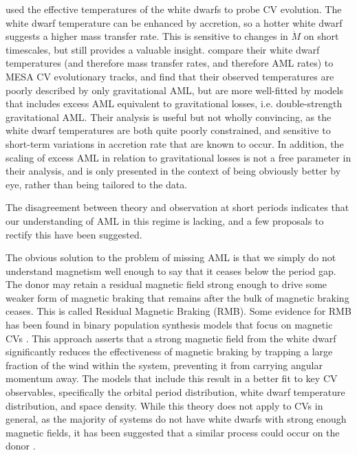\citet{Pala2017a} used the effective temperatures of the white dwarfs to probe CV evolution. The white dwarf temperature can be enhanced by accretion, so a hotter white dwarf suggests a higher mass transfer rate. This is sensitive to changes in $\dot M$ on short timescales, but still provides a valuable insight. \citet{Pala2017a} compare their white dwarf temperatures (and therefore mass transfer rates, and therefore AML rates) to MESA CV evolutionary tracks, and find that their observed temperatures are poorly described by only gravitational AML, but are more well-fitted by models that includes excess AML equivalent to gravitational losses, i.e. double-strength gravitational AML. Their analysis is useful but not wholly convincing, as the white dwarf temperatures are both quite poorly constrained, and sensitive to short-term variations in accretion rate that are known to occur. In addition, the scaling of excess AML in relation to gravitational losses is not a free parameter in their analysis, and is only presented in the context of being obviously better by eye, rather than being tailored to the data.

The disagreement between theory and observation at short periods indicates that our understanding of AML in this regime is lacking, and a few proposals to rectify this have been suggested.

The obvious solution to the problem of missing AML is that we simply do not understand magnetism well enough to say that it ceases below the period gap. The donor may retain a residual magnetic field strong enough to drive some weaker form of magnetic braking that remains after the bulk of magnetic braking ceases. This is called Residual Magnetic Braking (RMB). Some evidence for RMB has been found in binary population synthesis models that focus on magnetic CVs \citep{belloni2020}. This approach asserts that a strong magnetic field from the white dwarf significantly reduces the effectiveness of magnetic braking by trapping a large fraction of the wind within the system, preventing it from carrying angular momentum away. The models that include this result in a better fit to key CV observables, specifically the orbital period distribution, white dwarf temperature distribution, and space density. While this theory does not apply to CVs in general, as the majority of systems do not have white dwarfs with strong enough magnetic fields, it has been suggested that a similar process could  occur on the donor \citep{garraffo2018}. 

